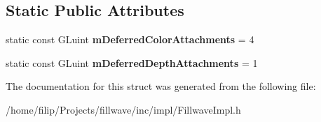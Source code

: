 \subsection*{Static Public Attributes}
\begin{DoxyCompactItemize}
\item 
\hypertarget{structfillwave_1_1Engine_1_1EngineImpl_a9e14ae8f1f2450f3fda8cce7dbab8c67}{}static const G\+Luint {\bfseries m\+Deferred\+Color\+Attachments} = 4\label{structfillwave_1_1Engine_1_1EngineImpl_a9e14ae8f1f2450f3fda8cce7dbab8c67}

\item 
\hypertarget{structfillwave_1_1Engine_1_1EngineImpl_a0d67fbb9423b500e7304a40c445e5c68}{}static const G\+Luint {\bfseries m\+Deferred\+Depth\+Attachments} = 1\label{structfillwave_1_1Engine_1_1EngineImpl_a0d67fbb9423b500e7304a40c445e5c68}

\end{DoxyCompactItemize}


The documentation for this struct was generated from the following file\+:\begin{DoxyCompactItemize}
\item 
/home/filip/\+Projects/fillwave/inc/impl/Fillwave\+Impl.\+h\end{DoxyCompactItemize}
